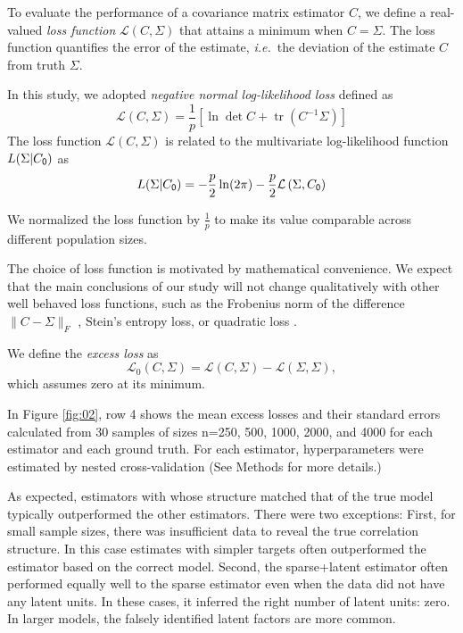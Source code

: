 \documentclass[10pt]{article}
\DeclareMathOperator{\Tr}{tr}
\newcommand{\loss}[1]{\mathcal L\left(#1\right)}
\newcommand{\eloss}[1]{\mathcal L_0\left(#1\right)}
\begin{document}
To evaluate the performance of a covariance matrix estimator $C$, we define a real-valued \emph{loss function} $\loss{C,\Sigma}$ that attains a minimum when $C=\Sigma$.  The loss function quantifies the error of the estimate, \emph{i.e.}~the deviation of the estimate $C$ from truth $\Sigma$.

In this study, we adopted \emph{negative normal log-likelihood loss} defined as
\begin{equation}\label{eq:loss}
    \loss{C,\Sigma} = \frac 1 p\left[\ln \det C + \Tr(C^{-1}\Sigma)\right]
\end{equation}
The loss function $\loss{C,\Sigma}$ is related to the multivariate log-likelihood function $L(\Sigma|C_{\sf 0})$ as
\begin{equation}
    L(\Sigma|C_{\sf 0}) = -\frac p 2 \ln(2\pi) -\frac p 2 \loss{\Sigma,C_{\sf 0}}
\end{equation}

We normalized the loss function by $\frac 1 p$ to make its value comparable across different population sizes. 

The choice of loss function is motivated by mathematical convenience. We expect that the main conclusions of our study will not change qualitatively with other well behaved loss functions, such as the Frobenius norm of the difference $\|C-\Sigma\|_F$ \cite{Ledoit:2004,Schafer:2005}, Stein's entropy loss, or quadratic loss \cite{James:1961,Fan:2008}.  

We define the \emph{excess loss} as
\begin{equation}\label{eq:excess-loss}
    \eloss{C,\Sigma} = \loss{C,\Sigma}-\loss{\Sigma,\Sigma},
\end{equation}
which assumes zero at its minimum. 

In Figure \ref{fig:02}, row 4 shows the mean excess losses and their standard errors calculated from 30 samples of sizes n=250, 500, 1000, 2000, and 4000 for each estimator and each ground truth. For each estimator, hyperparameters were estimated by nested cross-validation (See Methods for more details.)

As expected, estimators with whose structure matched that of the true model typically outperformed the other estimators. There were two exceptions: First, for small sample sizes, there was insufficient data to reveal the true correlation structure. In this case estimates with simpler targets often outperformed the estimator based on the correct model. Second, the sparse+latent estimator often performed equally well to the sparse estimator even when the data did not have any latent units.  In these cases, it inferred the right number of latent units: zero. In larger models, the falsely identified latent factors are more common.
\end{document}
